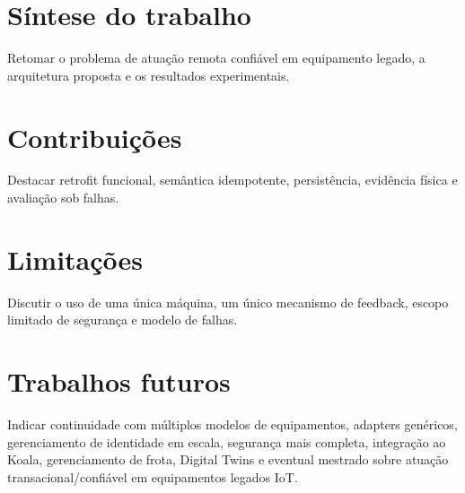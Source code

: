 \section{Síntese do trabalho}
Retomar o problema de atuação remota confiável em equipamento legado, a arquitetura proposta e os resultados experimentais.

\section{Contribuições}
Destacar retrofit funcional, semântica idempotente, persistência, evidência física e avaliação sob falhas.

\section{Limitações}
Discutir o uso de uma única máquina, um único mecanismo de feedback, escopo limitado de segurança e modelo de falhas.

\section{Trabalhos futuros}
Indicar continuidade com múltiplos modelos de equipamentos, adapters genéricos, gerenciamento de identidade em escala, segurança mais completa, integração ao Koala, gerenciamento de frota, Digital Twins e eventual mestrado sobre atuação transacional/confiável em equipamentos legados IoT.
